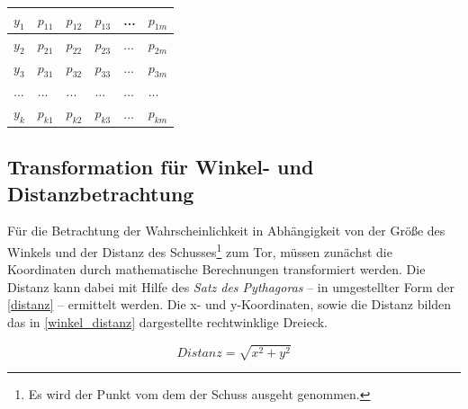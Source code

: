 \tablelasttail{}
\begin{center}%
\begin{supertabular}{ | P{3.2cm} | P{1.5cm} | P{1.5cm} | P{1.5cm} | P{1.5cm} |  P{1.5cm} |}
\textsf{$y_1$}	&   $p_{11}$	& 	$p_{12}$  &  $p_{13}$  &  ... &  $p_{1m}$\\
\hline
\textsf{$y_2$}	&   $p_{21}$	& 	$p_{22}$  &  $p_{23}$  &  ... &  $p_{2m}$\\
\hline
\textsf{$y_3$}	&   $p_{31}$	& 	$p_{32}$  &  $p_{33}$  &  ... &  $p_{3m}$\\
\hline
\textsf{...}	&   ...	        & 	...       &  ...        &  ... & ...\\
\hline
\textsf{$y_k$}	&   $p_{k1}$	& 	$p_{k2}$  &  $p_{k3}$  &  ... &  $p_{km	}$\\
\hline
\end{supertabular}
\end{center}




\subsection{Transformation für Winkel- und Distanzbetrachtung}
\label{wdt}
Für die Betrachtung der Wahrscheinlichkeit in Abhängigkeit von der Größe des Winkels und der Distanz des Schusses\footnote{Es wird der Punkt vom dem der Schuss ausgeht genommen.} zum Tor, müssen zunächst die Koordinaten durch mathematische Berechnungen transformiert werden. Die Distanz kann dabei mit Hilfe des \textit{Satz des Pythagoras} -- in umgestellter Form der \vref{distanz} -- ermittelt werden. Die x- und y-Koordinaten, sowie die Distanz bilden das in \vref{winkel_distanz} dargestellte rechtwinklige Dreieck. 

\begin{equation}
\label{distanz}
Distanz= \sqrt{x^2 + y^2}
\end{equation}

